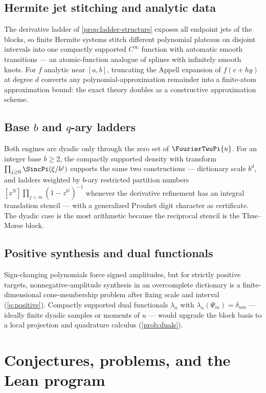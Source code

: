 \documentclass[11pt,oneside]{article}
\numberwithin{equation}{section}
\theoremstyle{definition}
\theoremstyle{remark}
\begin{document}
\subsection{Hermite jet stitching and analytic data}
The derivative ladder of \cref{prop:ladder-structure} exposes all
endpoint jets of the blocks, so finite Hermite systems stitch
different polynomial plateaus on disjoint intervals into one
compactly supported $C^\infty$ function with automatic smooth
transitions --- an atomic-function analogue of splines with
infinitely smooth knots.  For $f$ analytic near $[a,b]$, truncating
the Appell expansion of $f(c+hy)$ at degree $d$ converts any
polynomial-approximation remainder into a finite-atom approximation
bound: the exact theory doubles as a constructive approximation
scheme.

\subsection{Base \texorpdfstring{$b$}{b} and
\texorpdfstring{$q$}{q}-ary ladders}
Both engines are dyadic only through the zero set of
$\FourierTwoPi{u}$.  For an integer base $b\ge2$, the compactly supported
density with transform $\prod_{j\ge0}\SincPi(\xi/b^{j})$ supports the
same two constructions --- dictionary scale $b^{d}$, and ladders
weighted by $b$-ary restricted partition numbers
$[z^{N}]\prod_{j<m}(1-z^{b^{j}})^{-1}$ whenever the derivative
refinement has an integral translation stencil --- with a generalized
Prouhet digit character as certificate.  The dyadic case is the most
arithmetic because the reciprocal stencil is the Thue--Morse block.

\subsection{Positive synthesis and dual functionals}
Sign-changing polynomials force signed amplitudes, but for strictly
positive targets, nonnegative-amplitude synthesis in an overcomplete
dictionary is a finite-dimensional cone-membership problem after
fixing scale and interval (\cref{q:positive}).  Compactly supported
dual functionals $\lambda_n$ with
$\lambda_n(\Psi_m)=\delta_{nm}$ --- ideally finite dyadic samples or
moments of $u$ --- would upgrade the block basis to a local
projection and quadrature calculus (\cref{prob:duals}).

\section{Conjectures, problems, and the Lean program}
\label{sec:frontiers-poly}
\end{document}

